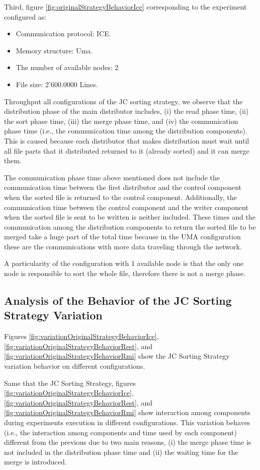 Third, figure \ref{fig:originalStrategyBehaviorIce} corresponding to the experiment configured as: 
\begin{itemize}
	\item Communication protocol: ICE.
	\item  Memory structure: Uma.
	\item The number of available nodes: 2
	\item File size: 2'600.0000 Lines.
\end{itemize}

Throughput all configurations of the JC sorting strategy, we observe that the distribution phase of the main distributor includes, (i) the read phase time, (ii) the sort phase time, (iii) the merge phase time, and (iv) the communication phase time (i.e., the communication time among the distribution components). This is caused because each distributor that makes distribution must wait until all file parts that it distributed returned to it (already sorted) and it can merge them.

The communication phase time above mentioned does not include the communication time between the first distributor and the control component when the sorted file is returned to the control component. Additionally, the communication time between the control component and the writer component when the sorted file is sent to be written is neither included. These times and the communication among the distribution components to return the sorted file to be merged take a huge part of the total time because in the UMA configuration these are the communications with more data traveling through the network.

A particularity of the configuration with 1 available node is that the only one node is responsible to sort the whole file, therefore there is not a merge phase.
\subsection{Analysis of the Behavior of the JC Sorting Strategy Variation }

Figures \ref{fig:variationOriginalStrategyBehaviorIce}, \ref{fig:variationOriginalStrategyBehaviorRest}, and \ref{fig:variationOriginalStrategyBehaviorRmi} show the JC Sorting Strategy variation behavior on different configurations. 

Same that the JC Sorting Strategy, figures \ref{fig:variationOriginalStrategyBehaviorIce}, \ref{fig:variationOriginalStrategyBehaviorRest}, and \ref{fig:variationOriginalStrategyBehaviorRmi} show interaction among components during experiments execution in different configurations. This variation behaves (i.e., the interaction among components and time used by each component) different from the previous due to two main reasons, (i) the merge phase time is not included in the distribution phase time and (ii) the waiting time for the merge is introduced.

